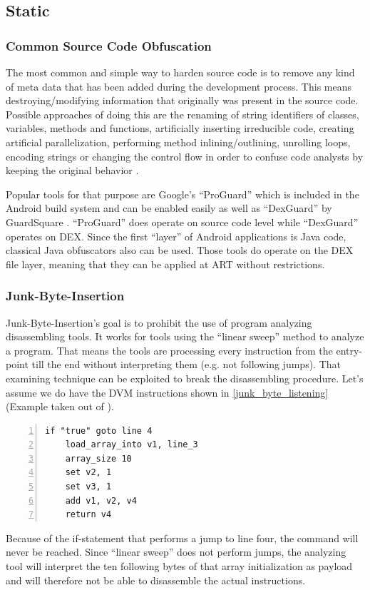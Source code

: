 \subsection{Static}
\subsubsection{Common Source Code Obfuscation}
The most common and simple way to harden source code is to remove any kind of meta data
that has been added during the development process. This means destroying/modifying
information that originally was present in the source code.
Possible approaches of doing this are the renaming of string identifiers of
classes, variables, methods and functions, artificially inserting
irreducible code, creating artificial parallelization, performing method inlining/outlining, unrolling loops, encoding strings or changing the control flow in order to confuse code analysts by keeping the original behavior
\parencite[p.87]{lvl_imp}.

Popular tools for that purpose are Google's ``ProGuard''
\parencite{proguardtool} which is included in the Android build system and
can be enabled easily as well as ``DexGuard'' by GuardSquare
\parencite{dexguardtool}. ``ProGuard'' does
operate on source code level while ``DexGuard'' operates on DEX.
Since the first ``layer'' of Android applications is Java code, classical Java
obfuscators also can be used.
Those tools do operate on the DEX file layer, meaning that they can be applied at ART without restrictions.

\subsubsection{Junk-Byte-Insertion}
Junk-Byte-Insertion's goal is to prohibit the use of program analyzing
disassembling tools. It works for tools using the
``linear sweep'' method to analyze a program. That means
the tools are processing every instruction from the entry-point
till the end without interpreting them (e.g. not following jumps).
That examining technique can be exploited to break the disassembling
procedure. Let's assume we do have the DVM instructions shown in \autoref{junk_byte_listening}(Example taken out of \parencite[p.67]{lvl_imp}).
  \begin{lstlisting}[language={[x64]Assembler}, caption=Junk-Byte-Insertion, label=junk_byte_listening, numbers=left]
    if "true" goto line 4
    load_array_into v1, line_3
    array_size 10
    set v2, 1
    set v3, 1
    add v1, v2, v4
    return v4
  \end{lstlisting}
Because of the if-statement that performs a jump to line four, the  command will never be reached.
Since ``linear sweep'' does not perform jumps, the analyzing tool
will interpret the ten following bytes of that array initialization as payload and will therefore not be able to disassemble the actual instructions.


